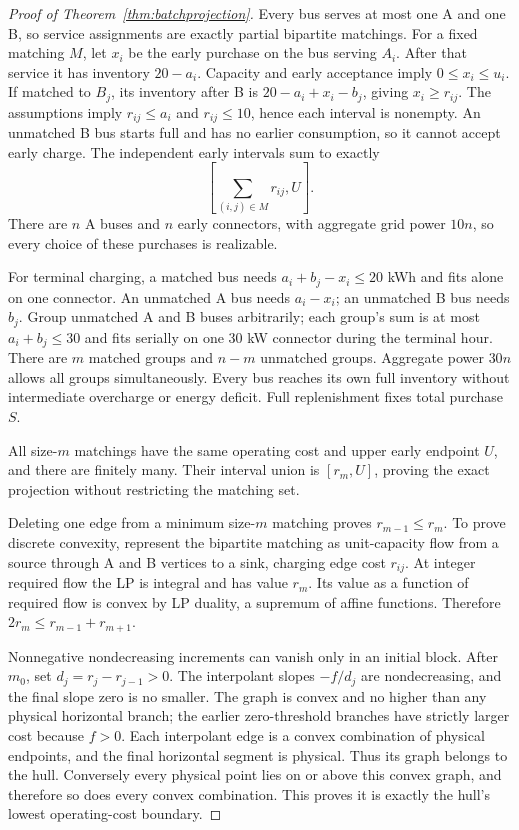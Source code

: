 \begin{proof}[Proof of Theorem~\ref{thm:batchprojection}]
Every bus serves at most one A and one B, so service assignments are exactly
partial bipartite matchings. For a fixed matching $M$, let $x_i$ be the
early purchase on the bus serving $A_i$. After that service it has inventory
$20-a_i$. Capacity and early acceptance imply $0\le x_i\le u_i$.
If matched to $B_j$, its inventory after B is $20-a_i+x_i-b_j$, giving
$x_i\ge r_{ij}$. The assumptions imply $r_{ij}\le a_i$ and
$r_{ij}\le10$, hence each interval is nonempty. An unmatched B bus
starts full and has no earlier consumption, so it cannot accept early
charge. The independent early intervals sum to exactly
\[
 \left[\sum_{(i,j)\in M}r_{ij},U\right].
\]
There are $n$ A buses and $n$ early connectors, with aggregate grid
power $10n$, so every choice of these purchases is realizable.

For terminal charging, a matched bus needs $a_i+b_j-x_i\le20$ kWh
and fits alone on one connector. An unmatched A bus needs $a_i-x_i$;
an unmatched B bus needs $b_j$. Group unmatched A and B buses arbitrarily;
each group's sum is at most $a_i+b_j\le30$ and fits serially on one
30 kW connector during the terminal hour. There are $m$ matched groups
and $n-m$ unmatched groups. Aggregate power $30n$ allows all groups
simultaneously. Every bus reaches its own full inventory without intermediate
overcharge or energy deficit. Full replenishment fixes total purchase $S$.

All size-$m$ matchings have the same operating cost and upper early endpoint
$U$, and there are finitely many. Their interval union is $[r_m,U]$,
proving the exact projection without restricting the matching set.

Deleting one edge from a minimum size-$m$ matching proves
$r_{m-1}\le r_m$. To prove discrete convexity, represent the bipartite
matching as unit-capacity flow from a source through A and B vertices to
a sink, charging edge cost $r_{ij}$. At integer required flow the LP is
integral and has value $r_m$. Its value as a function of required flow is
convex by LP duality, a supremum of affine functions. Therefore
$2r_m\le r_{m-1}+r_{m+1}$.

Nonnegative nondecreasing increments can vanish only in an initial block.
After $m_0$, set $d_j=r_j-r_{j-1}>0$. The interpolant slopes
$-f/d_j$ are nondecreasing, and the final slope zero is no smaller.
The graph is convex and no higher than any physical horizontal branch;
the earlier zero-threshold branches have strictly larger cost because $f>0$.
Each interpolant edge is a convex combination of physical endpoints, and
the final horizontal segment is physical. Thus its graph belongs to the
hull. Conversely every physical point lies on or above this convex graph,
and therefore so does every convex combination. This proves it is exactly
the hull's lowest operating-cost boundary.
\end{proof}

